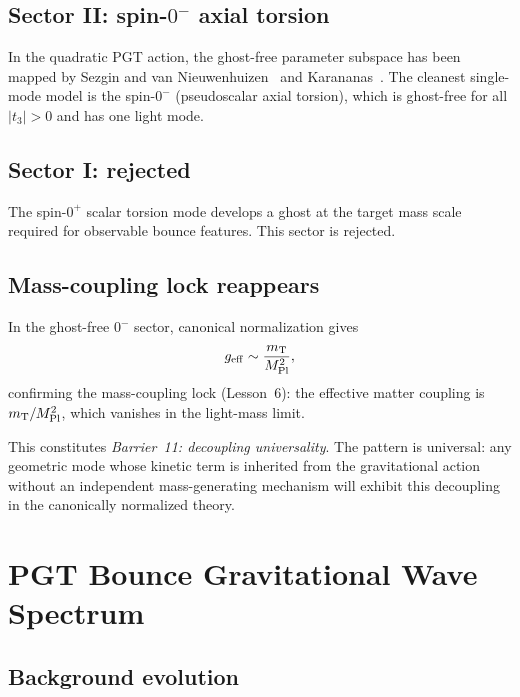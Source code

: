 \documentclass[aps,prd,twocolumn,superscriptaddress,showpacs,preprintnumbers,
  nofootinbib,longbibliography,floatfix]{revtex4-2}
\newcommand{\MPl}{M_{\rm Pl}}
\newcommand{\mT}{m_{\rm T}}
\newcommand{\geff}{g_{\rm eff}}
\begin{document}
\subsection{Sector II: spin-$0^-$ axial torsion}

In the quadratic PGT action, the ghost-free parameter subspace has been
mapped by Sezgin and van
Nieuwenhuizen~\cite{SezginNieuwenhuizen1980} and
Karananas~\cite{Karananas2015}. The cleanest single-mode model is the
spin-$0^-$ (pseudoscalar axial torsion), which is ghost-free for all
$|t_3| > 0$ and has one light mode.

\subsection{Sector I: rejected}

The spin-$0^+$ scalar torsion mode develops a ghost at the target mass
scale required for observable bounce features. This sector is rejected.

\subsection{Mass-coupling lock reappears}

In the ghost-free $0^-$ sector, canonical normalization gives
\begin{equation}\label{eq:geff_pgt}
  \geff \sim \frac{\mT}{\MPl^2},
\end{equation}
confirming the mass-coupling lock (Lesson~6): the effective matter
coupling is $\mT/\MPl^2$, which vanishes in the light-mass limit.

This constitutes \textit{Barrier~11: decoupling universality}. The
pattern is universal: any geometric mode whose kinetic term is inherited
from the gravitational action without an independent mass-generating
mechanism will exhibit this decoupling in the canonically normalized
theory.


\section{PGT Bounce Gravitational Wave Spectrum}\label{sec:pgt_gw}

\subsection{Background evolution}
\end{document}
